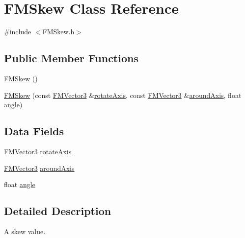 \hypertarget{classFMSkew}{
\section{FMSkew Class Reference}
\label{classFMSkew}
}


{\ttfamily \#include $<$FMSkew.h$>$}

\subsection*{Public Member Functions}
\begin{DoxyCompactItemize}
\item 
\hyperlink{classFMSkew_aa668311a8e0eb9af847338f17f7f84d3}{FMSkew} ()
\item 
\hyperlink{classFMSkew_aed3d20ab9e8d8d974e23b8aa674de880}{FMSkew} (const \hyperlink{classFMVector3}{FMVector3} \&\hyperlink{classFMSkew_a7cf70bef4d980753e946c20ddbe24e80}{rotateAxis}, const \hyperlink{classFMVector3}{FMVector3} \&\hyperlink{classFMSkew_aeb3dfd593df446ebdc89996b803ff5f0}{aroundAxis}, float \hyperlink{classFMSkew_a3001b0a58b660f6b4677aa6e0381e25e}{angle})
\end{DoxyCompactItemize}
\subsection*{Data Fields}
\begin{DoxyCompactItemize}
\item 
\hyperlink{classFMVector3}{FMVector3} \hyperlink{classFMSkew_a7cf70bef4d980753e946c20ddbe24e80}{rotateAxis}
\item 
\hyperlink{classFMVector3}{FMVector3} \hyperlink{classFMSkew_aeb3dfd593df446ebdc89996b803ff5f0}{aroundAxis}
\item 
float \hyperlink{classFMSkew_a3001b0a58b660f6b4677aa6e0381e25e}{angle}
\end{DoxyCompactItemize}


\subsection{Detailed Description}
A skew value. 

